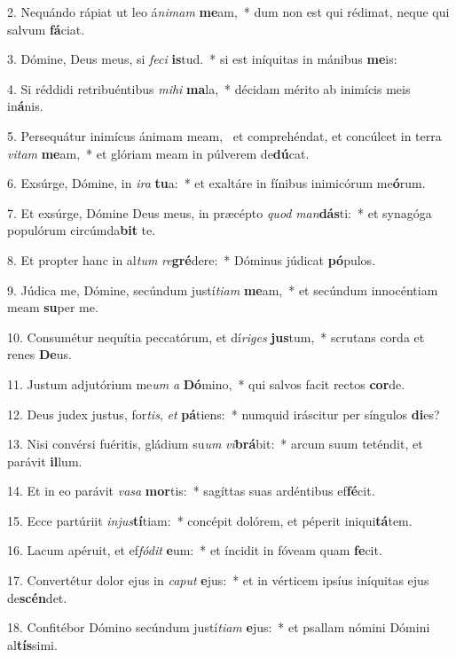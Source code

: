 2. Nequándo rápiat ut leo á\textit{ni}\textit{mam} \textbf{me}am,~*  dum non est qui rédimat, neque qui salvum \textbf{fá}ciat.\

3. Dómine, Deus meus, si \textit{fe}\textit{ci} \textbf{is}tud.~*  si est iníquitas in mánibus \textbf{me}is:\

4. Si réddidi retribuéntibus \textit{mi}\textit{hi} \textbf{ma}la,~*  décidam mérito ab inimícis meis in\textbf{á}nis.\

5. Persequátur inimícus ánimam meam, \dag\  et comprehéndat, et concúlcet in terra \textit{vi}\textit{tam} \textbf{me}am,~*  et glóriam meam in púlverem de\textbf{dú}cat.\

6. Exsúrge, Dómine, in \textit{i}\textit{ra} \textbf{tu}a:~*  et exaltáre in fínibus inimicórum me\textbf{ó}rum.\

7. Et exsúrge, Dómine Deus meus, in præcépto \textit{quod} \textit{man}\textbf{dás}ti:~*  et synagóga populórum circúmda\textbf{bit} te.\

8. Et propter hanc in al\textit{tum} \textit{re}\textbf{gré}dere:~*  Dóminus júdicat \textbf{pó}pulos.\

9. Júdica me, Dómine, secúndum justí\textit{ti}\textit{am} \textbf{me}am,~*  et secúndum innocéntiam meam \textbf{su}per me.\

10. Consumétur nequítia peccatórum, et dí\textit{ri}\textit{ges} \textbf{jus}tum,~*  scrutans corda et renes \textbf{De}us.\

11. Justum adjutórium me\textit{um} \textit{a} \textbf{Dó}mino,~*  qui salvos facit rectos \textbf{cor}de.\

12. Deus judex justus, for\textit{tis}, \textit{et} \textbf{pá}tiens:~*  numquid iráscitur per síngulos \textbf{di}es?\

13. Nisi convérsi fuéritis, gládium su\textit{um} \textit{vi}\textbf{brá}bit:~*  arcum suum teténdit, et parávit \textbf{il}lum.\

14. Et in eo parávit \textit{va}\textit{sa} \textbf{mor}tis:~*  sagíttas suas ardéntibus ef\textbf{fé}cit.\

15. Ecce partúriit \textit{in}\textit{jus}\textbf{tí}tiam:~*  concépit dolórem, et péperit iniqui\textbf{tá}tem.\

16. Lacum apéruit, et ef\textit{fó}\textit{dit} \textbf{e}um:~*  et íncidit in fóveam quam \textbf{fe}cit.\

17. Convertétur dolor ejus in \textit{ca}\textit{put} \textbf{e}jus:~*  et in vérticem ipsíus iníquitas ejus de\textbf{scén}det.\

18. Confitébor Dómino secúndum justí\textit{ti}\textit{am} \textbf{e}jus:~*  et psallam nómini Dómini al\textbf{tís}simi.\

